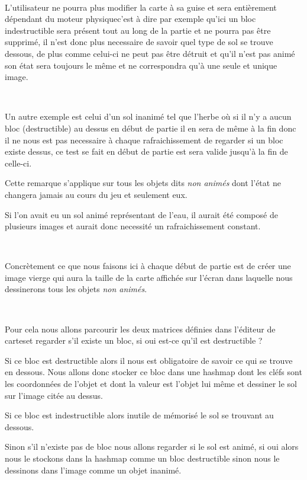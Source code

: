 			$\,$	
			
			L'utilisateur ne pourra plus modifier la carte à sa guise et sera
			entièrement dépendant du moteur physique\footnotemark[3] c'est à dire par
			exemple qu'ici un bloc indestructible sera présent tout au long de la
			partie et ne pourra pas être supprimé, il n'est donc plus necessaire de
			savoir quel type de sol se trouve dessous, de plus comme celui-ci ne peut pas
			être détruit et qu'il n'est pas animé son état sera toujours le même et ne
			correspondra qu'à une seule et unique image.
			
			$\,$			
			
			Un autre exemple est celui d'un sol inanimé tel que l'herbe où si il n'y a
			aucun bloc (destructible) au dessus en début de partie il en sera de même à
			la fin donc il ne nous est pas necessaire à chaque rafraichissement de
			regarder si un bloc existe dessus, ce test se fait en début de partie est
			sera valide jusqu'à la fin de celle-ci.
			
			
			Cette remarque s'applique sur tous les objets dits \emph{non animés} dont
			l'état ne changera jamais au cours du jeu et seulement eux.
			
			
			Si l'on avait eu un sol animé représentant de l'eau, il aurait été composé de
			plusieurs images et aurait donc necessité un rafraichissement constant.

			$\,$
			
			Concrètement ce que nous faisons ici à chaque début de partie est de créer
			une image vierge qui aura la taille de la carte affichée sur l'écran dans
			laquelle nous dessinerons tous les objets \emph{non animés}.
			
			$\,$
			
			Pour cela nous allons parcourir les deux matrices définies dans l'éditeur de
			cartes\footnotemark[2] et regarder s'il existe un bloc, si oui est-ce
			qu'il est destructible ?
			
			Si ce bloc est destructible alors il nous est obligatoire de savoir ce qui se
			trouve en dessous.
			Nous allons donc stocker ce bloc dans une hashmap dont les cléfs sont les
			coordonnées de l'objet et dont la valeur est l'objet lui même et dessiner le
			sol sur l'image citée au dessus.
			
			Si ce bloc est indestructible alors inutile de mémorisé le sol se trouvant
			au dessous.
			
			Sinon s'il n'existe pas de bloc nous allons regarder si le sol est animé, si
			oui alors nous le stockons dans la hashmap comme un bloc destructible sinon
			nous le dessinons dans l'image comme un objet inanimé.
			
